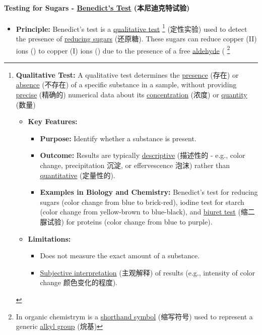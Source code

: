 \paragraph{Testing for Sugars - \underline{Benedict's Test} (本尼迪克特试验)}
\begin{itemize}
    \item \textbf{Principle:} Benedict's test is a \underline{qualitative test} \footnote{\textbf{Qualitative Test:} A qualitative
    test determines the \underline{presence} (存在) or \underline{absence} (不存在) of a specific substance in a sample, without
    providing \underline{precise} (精确的) numerical data about its \underline{concentration} (浓度) or \underline{quantity} (数量)
    \begin{itemize}
        \item \textbf{Key Features:}
        \begin{itemize}
            \item \textbf{Purpose:} Identify whether a substance is present.
            \item \textbf{Outcome:} Results are typically \underline{descriptive} (描述性的 - e.g., color change, precipitation
            沉淀, or effervescence 泡沫) rather than \underline{quantitative} (定量性的).
            \item \textbf{Examples in Biology and Chemistry:} Benedict's test for reducing sugars (color change from blue to
            brick-red), iodine test for starch (color change from yellow-brown to blue-black), and \underline{biuret test}
            (缩二脲试验) for proteins (color change from blue to purple).
        \end{itemize}
        \item \textbf{Limitations:}
        \begin{itemize}
            \item Does not measure the exact amount of a substance.
            \item \underline{Subjective interpretation} (主观解释)  of results (e.g., intensity of color change 颜色变化的程度).
        \end{itemize}
    \end{itemize}} (定性实验) used to detect the presence of \underline{reducing sugars} (还原糖). These sugars can reduce copper
    (II) ions () to copper (I) ions () due to the presence of a free \underline{aldehyde} ( \footnote{In
    organic chemistrym  is a \underline{shorthand symbol} (缩写符号) used to represent a generic \underline{alkyl group} (烷基)
}
\end{itemize}
